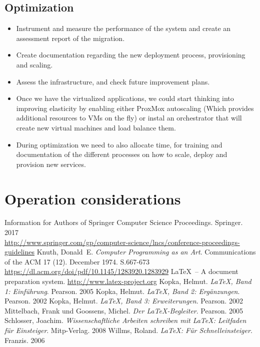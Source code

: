 \documentclass{llncs}
\begin{document}
\subsection{Optimization}

\begin{itemize}
  \item Instrument and measure the performance of the system and create an assessment report of the migration.
        
  \item Create documentation regarding the new deployment process, provisioning and scaling.
        
  \item Assess the infrastructure, and check future improvement plans.
        
  \item Once we have the virtualized applications, we could start thinking into improving elasticity by enabling either ProxMox autoscaling (Which provides additional resources to VMs on the fly) or instal an orchestrator that will create new virtual machines and load balance them.
        
  \item During optimization we need to also allocate time, for training and documentation of the different processes on how to scale, deploy and provision new services.
\end{itemize}

\section{Operation considerations}


\begin{thebibliography}{5}
  
  Information for Authors of Springer Computer Science Proceedings. Springer. 2017\\
  \url{http://www.springer.com/gp/computer-science/lncs/conference-proceedings-guidelines}
  Knuth, Donald~E. \textsl{Computer Programming as an Art}. Communications of the ACM 17 (12). December 1974. S.667-673\\
  \url{https://dl.acm.org/doi/pdf/10.1145/1283920.1283929}
  \LaTeX\ -- A document preparation system.
  \url{http://www.latex-project.org}
  Kopka, Helmut. \textsl{\LaTeX, Band 1: Einführung}. Pearson. 2005
  Kopka, Helmut. \textsl{\LaTeX, Band 2: Ergänzungen}. Pearson. 2002
  Kopka, Helmut. \textsl{\LaTeX, Band 3: Erweiterungen}. Pearson. 2002
  Mittelbach, Frank und Goossens, Michel. \textsl{Der LaTeX-Begleiter}. Pearson. 2005
  Schlosser, Joachim. \textsl{Wissenschaftliche Arbeiten schreiben mit LaTeX: Leitfaden für Einsteiger}. Mitp-Verlag. 2008
  Willms, Roland. \textsl{\LaTeX: Für Schnelleinsteiger}. Franzis. 2006
\end{thebibliography}
\end{document}

